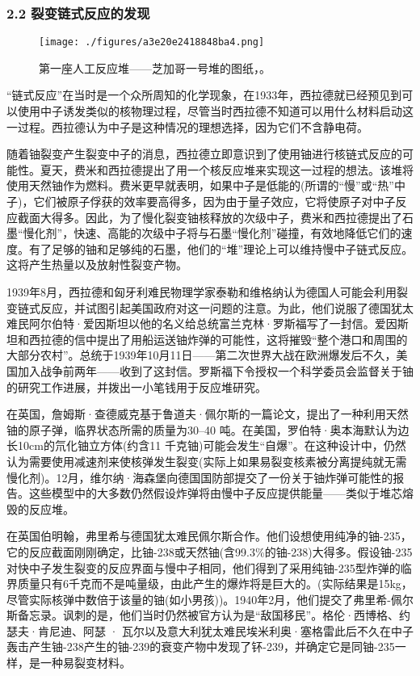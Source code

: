 \subsubsection{2.2 裂变链式反应的发现}
\begin{figure}[ht]
\centering
\texttt{[image: ./figures/a3e20e2418848ba4.png]}
\caption{第一座人工反应堆——芝加哥一号堆的图纸，。} \label{fig_HLB_11}
\end{figure}
“链式反应”在当时是一个众所周知的化学现象，在1933年，西拉德就已经预见到可以使用中子诱发类似的核物理过程，尽管当时西拉德不知道可以用什么材料启动这一过程。西拉德认为中子是这种情况的理想选择，因为它们不含静电荷。

随着铀裂变产生裂变中子的消息，西拉德立即意识到了使用铀进行核链式反应的可能性。夏天，费米和西拉德提出了用一个核反应堆来实现这一过程的想法。该堆将使用天然铀作为燃料。费米更早就表明，如果中子是低能的(所谓的“慢”或“热”中子)，它们被原子俘获的效率要高得多，因为由于量子效应，它将使原子对中子反应截面大得多。因此，为了慢化裂变铀核释放的次级中子，费米和西拉德提出了石墨“慢化剂”，快速、高能的次级中子将与石墨“慢化剂”碰撞，有效地降低它们的速度。有了足够的铀和足够纯的石墨，他们的“堆”理论上可以维持慢中子链式反应。这将产生热量以及放射性裂变产物。

1939年8月，西拉德和匈牙利难民物理学家泰勒和维格纳认为德国人可能会利用裂变链式反应，并试图引起美国政府对这一问题的注意。为此，他们说服了德国犹太难民阿尔伯特·爱因斯坦以他的名义给总统富兰克林·罗斯福写了一封信。爱因斯坦和西拉德的信中提出了用船运送铀炸弹的可能性，这将摧毁“整个港口和周围的大部分农村”。总统于1939年10月11日——第二次世界大战在欧洲爆发后不久，美国加入战争前两年——收到了这封信。罗斯福下令授权一个科学委员会监督关于铀的研究工作进展，并拨出一小笔钱用于反应堆研究。

在英国，詹姆斯·查德威克基于鲁道夫·佩尔斯的一篇论文，提出了一种利用天然铀的原子弹，临界状态所需的质量为30–40 吨。在美国，罗伯特·奥本海默认为边长10cm的氘化铀立方体(约含11 千克铀)可能会发生“自爆”。在这种设计中，仍然认为需要使用减速剂来使核弹发生裂变(实际上如果易裂变核素被分离提纯就无需慢化剂)。12月，维尔纳·海森堡向德国国防部提交了一份关于铀炸弹可能性的报告。这些模型中的大多数仍然假设炸弹将由慢中子反应提供能量——类似于堆芯熔毁的反应堆。

在英国伯明翰，弗里希与德国犹太难民佩尔斯合作。他们设想使用纯净的铀-235，它的反应截面刚刚确定，比铀-238或天然铀(含99.3\%的铀-238)大得多。假设铀-235对快中子发生裂变的反应界面与慢中子相同，他们得到了采用纯铀-235型炸弹的临界质量只有6千克而不是吨量级，由此产生的爆炸将是巨大的。(实际结果是15kg，尽管实际核弹中数倍于该量的铀(如小男孩))。1940年2月，他们提交了弗里希-佩尔斯备忘录。讽刺的是，他们当时仍然被官方认为是“敌国移民”。格伦·西博格、约瑟夫·肯尼迪、阿瑟 · 瓦尔以及意大利犹太难民埃米利奥·塞格雷此后不久在中子轰击产生铀-238产生的铀-239的衰变产物中发现了钚-239，并确定它是同铀-235一样，是一种易裂变材料。

